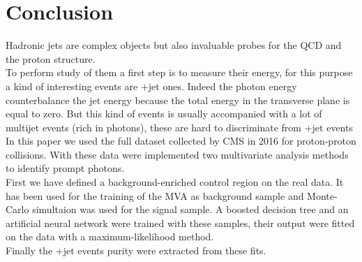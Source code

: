 \chapter*{Conclusion}
\label{sec:conclusion}

Hadronic jets are complex objects but also invaluable probes for the QCD and the proton structure.\\
To perform study of them a first step is to measure their energy, for this purpose a kind of interesting events are \textgamma+jet ones.
Indeed the photon energy counterbalance the jet energy because the total energy in the transverse plane is equal to zero.
But this kind of events is usually accompanied with a lot of multijet events (rich in photons), these are hard to discriminate from \textgamma+jet events\\
In this paper we used the full dataset collected by CMS in 2016 for proton-proton collisions.
With these data were implemented two multivariate analysis methods to identify prompt photons.\\
First we have defined a background-enriched control region on the real data.
It has been used for the training of the MVA as background sample and Monte-Carlo simultaion was used for the signal sample.
A boosted decision tree and an artificial neural network were trained with these samples, their output were fitted on the data with a maximum-likelihood method.\\
Finally the \textgamma+jet events purity were extracted from these fits.





